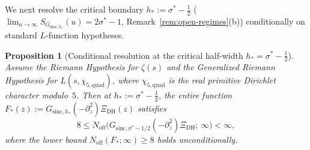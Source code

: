 \documentclass[11pt,a4paper,reqno]{amsart}
\newtheorem{proposition}[theorem]{Proposition}
\theoremstyle{definition}
\theoremstyle{remark}
\numberwithin{equation}{section}
\begin{document}
We next resolve the critical boundary $h_* := \sigma^* - \frac{1}{2}$ ($\lim_{u\to\infty} S_{G_{\mathrm{sinc},h_*}}(u) = 2\sigma^* - 1$, Remark~\ref{rem:open-regimes}(b)) conditionally on standard $L$-function hypotheses.

\begin{proposition}[Conditional resolution at the critical half-width $h_* = \sigma^* - \frac{1}{2}$]
\label{prop:critical-sinc}
Assume the Riemann Hypothesis for $\zeta(s)$ and the Generalized Riemann Hypothesis for $L(s, \chi_{5,\mathrm{quad}})$, where $\chi_{5,\mathrm{quad}}$ is the real primitive Dirichlet character modulo~$5$. Then at $h_* := \sigma^* - \frac{1}{2}$, the entire function $F_*(z) := G_{\mathrm{sinc},h_*}(-\partial_z^2)\Xi_{\mathrm{DH}}(z)$ satisfies
\begin{equation}
  8 \le N_{\mathrm{off}}\bigl(G_{\mathrm{sinc},\sigma^*-1/2}(-\partial_z^2)\Xi_{\mathrm{DH}};\, \infty\bigr) < \infty,
  \label{eq:critical-sinc-noff}
\end{equation}
where the lower bound $N_{\mathrm{off}}(F_*; \infty) \ge 8$ holds unconditionally.
\end{proposition}
\end{document}
